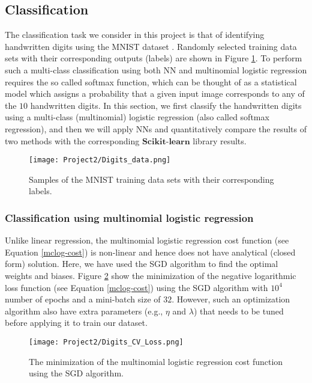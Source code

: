 \documentclass[a4paper]{article}
\begin{document}
\subsection{Classification}
The classification task we consider in this project is that of identifying handwritten digits using the MNIST dataset \cite{lecun-mnisthandwrittendigit-2010}. Randomly selected training data sets with their corresponding outputs (labels) are shown in Figure \ref{Digits_data}. To perform such a multi-class classification using both NN and multinomial logistic regression requires the so called softmax function, which can be thought of as a statistical model which assigns a probability that a given input image corresponds to any of the $10$ handwritten digits. In this section, we first classify the handwritten digits using a multi-class (multinomial) logistic regression (also called softmax regression), and then we will apply NNs and quantitatively compare the results of two methods with the corresponding $\mathbf{Scikit}$-$\mathbf{learn}$ library results. 

\begin{figure}[H]
  \centering
  \texttt{[image: Project2/Digits\_data.png]}
  \caption{Samples of the MNIST training data sets with their corresponding labels.}
    \label{Digits_data}
\end{figure}

\subsubsection{Classification using multinomial logistic regression}
Unlike linear regression, the multinomial logistic regression cost function (see Equation \ref{mclog-cost}) is non-linear and hence does not have analytical (closed form) solution. Here, we have used the SGD algorithm to find the optimal weights and biases. Figure \ref{Digits_CV_Loss} show the minimization of the negative logarithmic loss function (see Equation \ref{mclog-cost}) using the SGD algorithm with $10^4$ number of epochs and a mini-batch size of $32$. However, such an optimization algorithm also have extra parameters (e.g., $\eta$ and $\lambda$) that needs to be tuned before applying it to train our dataset.

\begin{figure}[H]
  \centering
  \texttt{[image: Project2/Digits\_CV\_Loss.png]}
  \caption{The minimization of the multinomial logistic regression cost function using the SGD algorithm.}
    \label{Digits_CV_Loss}
\end{figure}
\end{document}
